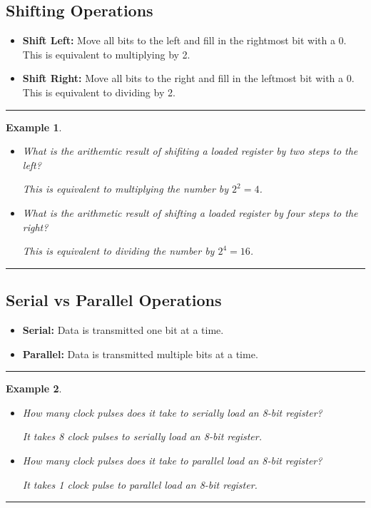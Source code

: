 \documentclass[12pt]{article}
\newtheorem{example}{Example}
\newenvironment{examp}
{
    \vspace{0.5cm}
    \hrule
    \begin{example}\upshape
}
{
    \end{example}
    \hrule
    \vspace{0.5cm}
}
\begin{document}
\subsection{Shifting Operations}
\begin{itemize}
	\item \textbf{Shift Left:} Move all bits to the left and fill in the
	      rightmost bit with a 0. This is equivalent to multiplying by 2.
	\item \textbf{Shift Right:} Move all bits to the right and fill in the
	      leftmost bit with a 0. This is equivalent to dividing by 2.
\end{itemize}
\begin{examp}
	\begin{itemize}
		\item What is the arithemtic result of shifiting a loaded register by two steps
		      to the left?

		      This is equivalent to multiplying the number by \(2^2 = 4\).

		\item What is the arithmetic result of shifting a loaded register by four steps
		      to the right?

		      This is equivalent to dividing the number by \(2^4 = 16\).
	\end{itemize}
\end{examp}
\subsection{Serial vs Parallel Operations}
\begin{itemize}
	\item \textbf{Serial:} Data is transmitted one bit at a time.
	\item \textbf{Parallel:} Data is transmitted multiple bits at a time.
\end{itemize}
\begin{examp}
	\begin{itemize}
		\item How many clock pulses does it take to serially load an 8-bit register?

		      It takes 8 clock pulses to serially load an 8-bit register.
		\item How many clock pulses does it take to parallel load an 8-bit register?

		      It takes 1 clock pulse to parallel load an 8-bit register.
	\end{itemize}
\end{examp}
\end{document}
